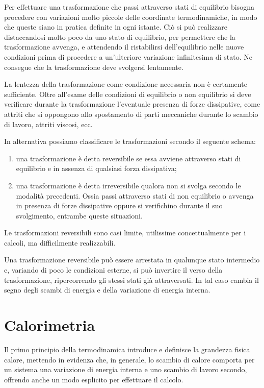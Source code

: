 \documentclass[class=book, crop=false, oneside, 12pt]{standalone}
\begin{document}
Per effettuare una trasformazione che passi attraverso stati di equilibrio bisogna procedere con variazioni molto piccole delle coordinate termodinamiche, in modo che queste siano in pratica definite in ogni istante.
Ciò si può realizzare distaccandosi molto poco da uno stato di equilibrio, per permettere che la trasformazione avvenga, e attendendo il ristabilirsi dell'equilibrio nelle nuove condizioni prima di procedere a un'ulteriore variazione infinitesima di stato. 
Ne consegue che la trasformazione deve svolgersi lentamente.

La lentezza della trasformazione come condizione necessaria non è certamente sufficiente.
Oltre all'esame delle condizioni di equilibrio o non equilibrio si deve verificare durante la trasformazione l'eventuale presenza di forze dissipative, come attriti che si oppongono allo spostamento di parti meccaniche durante lo scambio di lavoro, attriti viscosi, ecc.

In alternativa possiamo classificare le trasformazioni secondo il seguente schema:

\begin{enumerate}
    \item una trasformazione è detta reversibile se essa avviene attraverso stati di equilibrio e in assenza di qualsiasi forza dissipativa; 
    \item una trasformazione è detta irreversibile qualora non si svolga secondo le modalità precedenti.
    Ossia passi attraverso stati di non equilibrio o avvenga in presenza di forze dissipative oppure si verifichino durante il suo svolgimento, entrambe queste situazioni. 
\end{enumerate}
Le trasformazioni reversibili sono casi limite, utilissime concettualmente per i calcoli, ma difficilmente realizzabili.

Una trasformazione reversibile può essere arrestata in qualunque stato intermedio e, variando di poco le condizioni esterne, si può invertire il verso della trasformazione, ripercorrendo gli stessi stati già attraversati.  
In tal caso cambia il segno degli scambi di energia e della variazione di energia interna.

\section{Calorimetria}
Il primo principio della termodinamica introduce e definisce la grandezza fisica calore, mettendo in evidenza che, in generale, lo scambio di calore comporta per un sistema una variazione di energia interna e uno scambio di lavoro secondo, offrendo anche un modo esplicito per effettuare il calcolo.
\end{document}

